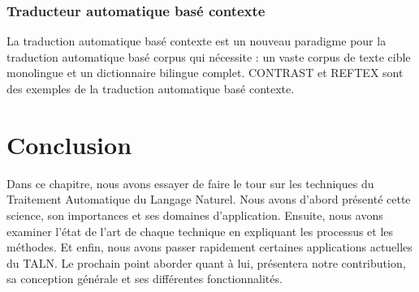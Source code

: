         \subsubsection{Traducteur automatique basé contexte}
        La traduction automatique basé contexte est un nouveau paradigme pour la traduction automatique basé corpus qui nécessite : un vaste corpus de texte cible monolingue et un dictionnaire bilingue complet. CONTRAST \cite{8} et REFTEX \cite{9} sont des exemples de la traduction automatique basé contexte.


\section{Conclusion}
Dans ce chapitre, nous avons essayer de faire le tour sur les techniques du Traitement Automatique du Langage Naturel. Nous avons d'abord présenté cette science, son importances et ses domaines d'application. Ensuite, nous avons examiner l'état de l'art de chaque technique en expliquant les processus et les méthodes. Et enfin, nous avons passer rapidement certaines applications actuelles du TALN.
Le prochain point aborder quant à lui, présentera notre contribution, sa conception générale et ses différentes fonctionnalités.  